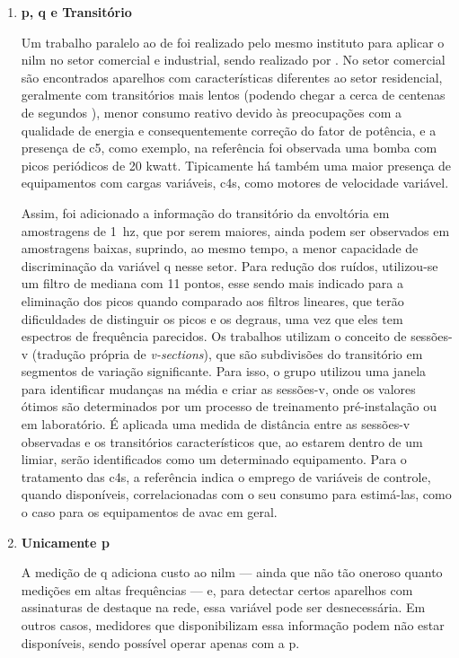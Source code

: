 \begin{enumerate}[label=\textbf{1.\arabic*},wide=\parindent]
\item \textbf{\Acrlong{p}, \Acrlong{q} e Transitório}
\label{nilm:pot_real_trans}

Um trabalho paralelo ao de \citeauthor*{nilm_hart_1992_8} foi
realizado pelo mesmo instituto para aplicar o \gls{nilm} no setor
comercial e industrial, sendo realizado por
\citet*{nilm_norford_leeb_medianfilt_1996_13,
nilm_leeb_spectral_envelope_1995_23}.
No setor comercial são encontrados aparelhos com características
diferentes ao setor residencial, geralmente com transitórios mais
lentos (podendo chegar a cerca de centenas de segundos
\cite{nilm_norford_leeb_medianfilt_1996_13}), menor consumo reativo
devido às preocupações com a qualidade de energia e consequentemente
correção do fator de potência, e a presença de \gls{c5}, como exemplo,
na referência foi observada uma bomba com picos periódicos de 20
k\acs{watt}. Tipicamente há também uma maior presença de
equipamentos com cargas variáveis, \glspl{c4}, como motores de
velocidade variável. 

Assim, foi adicionado a informação do transitório
da envoltória em amostragens de 1~\acs{hz}, que por serem
maiores, ainda podem ser observados em amostragens baixas, suprindo,
ao mesmo tempo, a menor capacidade de discriminação da variável
\gls{q} nesse setor. Para redução dos ruídos, utilizou-se um filtro de
mediana com 11 pontos, esse sendo mais indicado para a eliminação dos
picos quando comparado aos filtros lineares, que terão dificuldades de
distinguir os picos e os degraus, uma vez que eles tem espectros de
frequência parecidos. Os trabalhos utilizam o conceito de sessões-v
(tradução própria de \emph{v-sections}), que são subdivisões do
transitório em segmentos de variação significante. Para isso, o grupo
utilizou uma janela para identificar mudanças na média e criar as
sessões-v, onde os valores ótimos são determinados por um processo de
treinamento pré-instalação ou em laboratório. É aplicada uma medida de
distância entre as sessões-v observadas e os transitórios
característicos que, ao estarem dentro de um limiar, serão
identificados como um determinado equipamento. Para o tratamento das
\glspl{c4}, a referência indica o emprego de variáveis de controle,
quando disponíveis, correlacionadas com o seu consumo para estimá-las,
como o caso para os equipamentos de \gls{avac} em geral.

\item \textbf{Unicamente \acl{p}}
\label{nilm:pot_real}

A medição de \acl{q} adiciona custo ao \gls{nilm} --- ainda que
não tão oneroso quanto medições em altas frequências --- e, para
detectar certos aparelhos com assinaturas de destaque na rede,
essa variável pode ser desnecessária. Em outros casos, medidores que
disponibilizam essa informação podem não estar disponíveis, sendo
possível operar apenas com a \acl{p}.


\end{enumerate}
